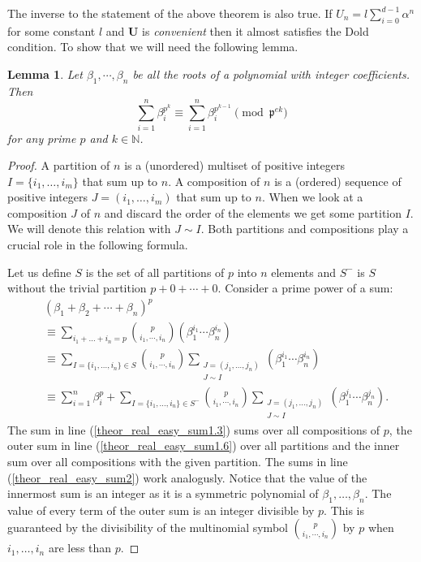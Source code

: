 \documentclass[preprint,12pt]{elsarticle}
\newcommand{\N}{\mathbb{N}}
\newcommand{\nice}{\textit{convenient} }
\newcommand{\pp}{\mathfrak{p} }
\newtheorem{lemma}{Lemma}
\begin{document}
The inverse to the statement of the above theorem is also true. If ${U}_n = l\sum_{i=0}^{d-1}\alpha^n$ for some constant $l$ and $\mathbf{U}$ is \nice then it almost satisfies the Dold condition. To show that we will need the following lemma. 

\begin{lemma}
    \label{lem_lte}
    Let $\beta_1, \cdots, \beta_n$ be all the roots of a polynomial with integer coefficients. Then 
    $$
        \sum_{i=1}^n \beta_i^{p^{k}} \equiv \sum_{i=1}^n \beta_i^{p^{k-1}}
        \pmod {\pp^{ek}} 
    $$
    for any prime $p$ and $k\in \N$.
   
\end{lemma}
\begin{proof}
    A partition of $n$ is a (unordered) multiset of positive integers $I = \{i_1, \ldots, i_m\}$ that sum up to $n$.
    A composition of $n$ is a (ordered) sequence of positive  integers $J = (i_1, \ldots, i_m)$ that sum up to $n$. When we look at a composition $J$ of $n$ and discard the order of the elements we get some partition $I$. We will denote this relation with $J\sim I$. Both partitions and compositions play a crucial role in the following formula.

    Let us define $S$ is the set of all partitions of $p$ into $n$ elements and $S^-$ is $S$ without the trivial partition $p+0+\cdots+0$.
    Consider a prime power of a sum:
    \begin{align}\label{theor_real_easy_sum1}
        &(\beta_1 + \beta_2 +\cdots+ \beta_n)^p 
        \\&\equiv 
        \sum_{i_1+\ldots+i_n=p} \binom{p}{i_1, \cdots, i_n} \left(\beta_1^{i_1} \cdots \beta_n^{i_n}\right) \label{theor_real_easy_sum1.3}\\&\equiv
         \sum_{I=\{i_1,\ldots,i_n\}\in S} \binom{p}{i_1, \cdots, i_n} \sum_{\substack{J=(j_1,\ldots, j_n) \\ J \sim I}}\left(\beta_1^{i_1} \cdots \beta_n^{i_n}\right) 
         \label{theor_real_easy_sum1.6}\\&\equiv
        \sum_{i=1}^n \beta_i^{p} + \sum_{I=\{i_1,\ldots,i_n\}\in S^-} \binom{p}{i_1, \cdots, i_n} 
          \sum_{\substack{J=(j_1,\ldots, j_n) \\ J \sim I}}\left(\beta_1^{j_1} \cdots \beta_n^{j_n}\right).\label{theor_real_easy_sum2}
    \end{align}
    The sum in line (\ref{theor_real_easy_sum1.3}) sums over all compositions of $p$, the outer sum in line (\ref{theor_real_easy_sum1.6}) over all partitions and the inner sum over all compositions with the given partition. The sums in line (\ref{theor_real_easy_sum2}) work analogusly. 
    Notice that the value of the innermost sum is an integer as it is a symmetric polynomial of $\beta_1, \ldots, \beta_n$. The value of every term of the outer sum is an integer divisible by $p$. This is guaranteed by the divisibility of the multinomial symbol $\binom{p}{i_1, \cdots, i_n}$ by $p$ when $i_1,\ldots ,i_n$ are less than $p$.
    

\end{proof}
\end{document}
